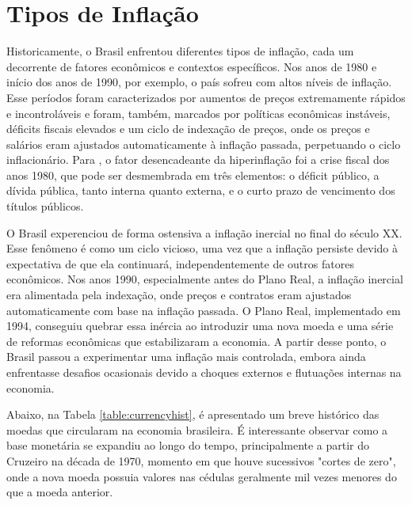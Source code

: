 \documentclass[12pt,oneside,a4paper,chapter=TITLE,english,brazil,sumario=abnt-6027-2012]{abntex2}
\begin{document}
\chapter{Tipos de Inflação}

Historicamente, o Brasil enfrentou diferentes tipos de inflação, cada um decorrente de fatores econômicos e contextos específicos. Nos anos de 1980 e início dos anos de 1990, por exemplo, o país sofreu com altos níveis de inflação. Esse períodos foram caracterizados por aumentos de preços extremamente rápidos e incontroláveis e foram, também, marcados por políticas econômicas instáveis, déficits fiscais elevados e um ciclo de indexação de preços, onde os preços e salários eram ajustados automaticamente à inflação passada, perpetuando o ciclo inflacionário. Para , o fator desencadeante da hiperinflação foi a crise fiscal dos anos 1980, que pode ser desmembrada em três elementos: o déficit público, a dívida pública, tanto interna quanto externa, e o curto prazo de vencimento dos títulos públicos.

O Brasil experenciou de forma ostensiva a inflação inercial no final do século XX. Esse fenômeno é como um ciclo vicioso, uma vez que a inflação persiste devido à expectativa de que ela continuará, independentemente de outros fatores econômicos. Nos anos 1990, especialmente antes do Plano Real, a inflação inercial era alimentada pela indexação, onde preços e contratos eram ajustados automaticamente com base na inflação passada. O Plano Real, implementado em 1994, conseguiu quebrar essa inércia ao introduzir uma nova moeda e uma série de reformas econômicas que estabilizaram a economia. A partir desse ponto, o Brasil passou a experimentar uma inflação mais controlada, embora ainda enfrentasse desafios ocasionais devido a choques externos e flutuações internas na economia.

Abaixo, na Tabela \ref{table:currencyhist}, é apresentado um breve histórico das moedas que circularam na economia brasileira. É interessante observar como a base monetária se expandiu ao longo do tempo, principalmente a partir do Cruzeiro na década de 1970, momento em que houve sucessivos "cortes de zero", onde a nova moeda possuia valores nas cédulas geralmente mil vezes menores do que a moeda anterior.

\vspace{0.2cm}
\end{document}
